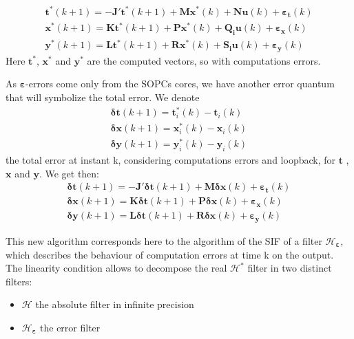 			\begin{eqnarray} \label{sifalgoerr}
				\boldsymbol{t}^*(k+1) = - \boldsymbol{J'}\boldsymbol{t}^*(k+1) + \boldsymbol{M} \boldsymbol{x}^*(k) + \boldsymbol{N} \boldsymbol{u}(k) + \boldsymbol{\varepsilon_t}(k)\\
				\boldsymbol{x}^*(k+1) = \boldsymbol{K}\boldsymbol{t}^*(k+1) + \boldsymbol{P} \boldsymbol{x}^*(k) + \boldsymbol{Q_i} \boldsymbol{u}(k) + \boldsymbol{\varepsilon_x}(k) \\
				\boldsymbol{y}^*(k+1) = \boldsymbol{L}\boldsymbol{t}^*(k+1) + \boldsymbol{R} \boldsymbol{x}^*(k) + \boldsymbol{S_i} \boldsymbol{u}(k) + \boldsymbol{\varepsilon_y}(k) 
			\end{eqnarray}
			Here $\boldsymbol{t}^*$, $\boldsymbol{x}^*$ and $\boldsymbol{y}^*$ are the computed vectors, so with computations errors.

	As $\boldsymbol{\varepsilon}$-errors come only from the SOPCs cores, we have another error quantum that will symbolize the total error.
			We denote 
			\begin{eqnarray}
			\boldsymbol{\delta t}(k+1)=\boldsymbol{t}_i^*(k)-\boldsymbol{t}_i(k) \\
			\boldsymbol{\delta x}(k+1)=\boldsymbol{x}_i^*(k)-\boldsymbol{x}_i(k) \\
			\boldsymbol{\delta y}(k+1)=\boldsymbol{y}_i^*(k)-\boldsymbol{y}_i(k) 
			\end{eqnarray}
			the total error at instant k,
			considering computations errors and loopback, for 
			$\boldsymbol{t}$ , $\boldsymbol{x}$ and $\boldsymbol{y}$.
			We get then:
			\begin{eqnarray} \label{deltaerr}
				\boldsymbol{\delta t}(k+1) = - \boldsymbol{J'}\boldsymbol{\delta t}(k+1) + \boldsymbol{M} \boldsymbol{\delta x}(k) + \boldsymbol{\varepsilon_t}(k)\\
				\boldsymbol{\delta x}(k+1) = \boldsymbol{K}\boldsymbol{\delta t}(k+1) + \boldsymbol{P} \boldsymbol{\delta x}(k) + \boldsymbol{\varepsilon_x}(k) \\
				\boldsymbol{\delta y}(k+1) = \boldsymbol{L}\boldsymbol{\delta t}(k+1) + \boldsymbol{R} \boldsymbol{\delta x}(k) + \boldsymbol{\varepsilon_y}(k) 
			\end{eqnarray}

			This new algorithm corresponds here to the algorithm of the SIF of a filter $\mathcal{H}_{\boldsymbol{\varepsilon}}$,
			which describes the behaviour of computation errors at time k on the output.
			The linearity condition allows to decompose the real $\mathcal{H}^*$ filter in two distinct filters:
			\begin{itemize}
				\item $\mathcal{H}$ the absolute filter in infinite precision
				\item $\mathcal{H}_{\boldsymbol{\varepsilon}}$ the error filter
			\end{itemize}

